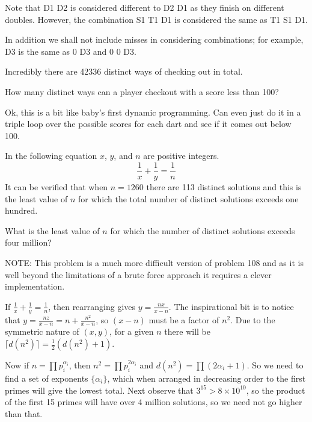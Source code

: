 Note that D1 D2 is considered different to D2 D1 as they finish on different doubles. However, the combination S1 T1 D1 is considered the same as T1 S1 D1.

In addition we shall not include misses in considering combinations; for example, D3 is the same as 0 D3 and 0 0 D3.

Incredibly there are 42336 distinct ways of checking out in total.

How many distinct ways can a player checkout with a score less than 100?

\vspace{-0.75cm}
Ok, this is a bit like baby's first dynamic programming.  Can even just do it in a triple loop over the possible scores for each dart and see if it comes out below 100.

\vspace{-0.75cm}
\normalsize



In the following equation $x$, $y$, and $n$ are positive integers.
$$\frac 1x + \frac 1y = \frac 1n$$
It can be verified that when $n = 1260$ there are 113 distinct solutions and this is the least value of $n$ for which the total number of distinct solutions exceeds one hundred.

What is the least value of $n$ for which the number of distinct solutions exceeds four million?

\footnotesize
NOTE: This problem is a much more difficult version of problem 108 and as it is well beyond the limitations of a brute force approach it requires a clever implementation.

\normalsize


If $\tfrac 1x + \tfrac 1y = \tfrac 1n$, then rearranging gives $y = \tfrac{nx}{x-n}$.  The inspirational bit is to notice
that $y = \tfrac{nz}{x-n} = n + \tfrac{n^2}{x-n}$, so $(x-n)$ must be a factor of $n^2$.  Due to the symmetric nature of $(x,y)$, for a given $n$ there will be $\lceil d(n^2) \rceil = \tfrac 12 (d(n^2)+1)$.

Now if $n = \prod p_i^{\alpha_i}$, then $n^2 = \prod p_i^{2\alpha_i}$ and $d(n^2) = \prod(2\alpha_i+1)$.  So we need to find a set of exponents $\{\alpha_i\}$, which when arranged in decreasing order to the first primes will give the lowest total.  Next observe that $3^{15} > 8\times10^{10}$, so the product of the first 15 primes will have over 4 million solutions, so we need not go higher than that.

